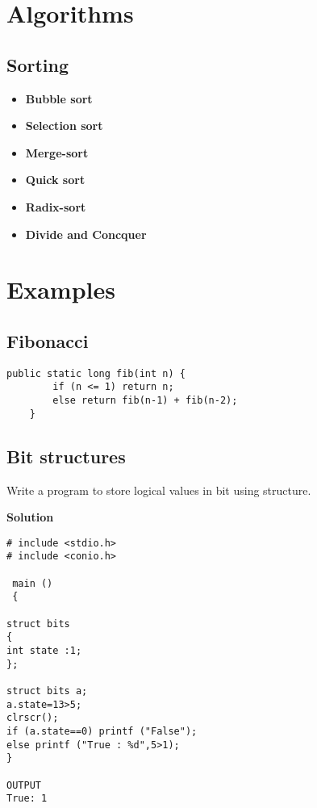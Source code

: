 \documentclass[letterpaper]{article}
\begin{document}
\section{Algorithms}

\subsection{Sorting}
\begin{itemize}
\item{\bf Bubble sort}
\item{\bf Selection sort}
\item{\bf Merge-sort} 

\item{\bf Quick sort}
\item{\bf Radix-sort}
\item{\bf Divide and Concquer}

\end{itemize}

\section{Examples}
\subsection{Fibonacci}
\begin{lstlisting}
public static long fib(int n) {
        if (n <= 1) return n;
        else return fib(n-1) + fib(n-2);
    }
    \end{lstlisting}
    
\subsection{Bit structures}

Write a program to store logical values in bit using structure.

\textbf{Solution}
\begin{verbatim}
# include <stdio.h>
# include <conio.h>

 main ()
 {

struct bits
{
int state :1;
};

struct bits a;
a.state=13>5;
clrscr();
if (a.state==0) printf ("False");
else printf ("True : %d",5>1);
}

OUTPUT
True: 1


\end{verbatim}
\end{document}
